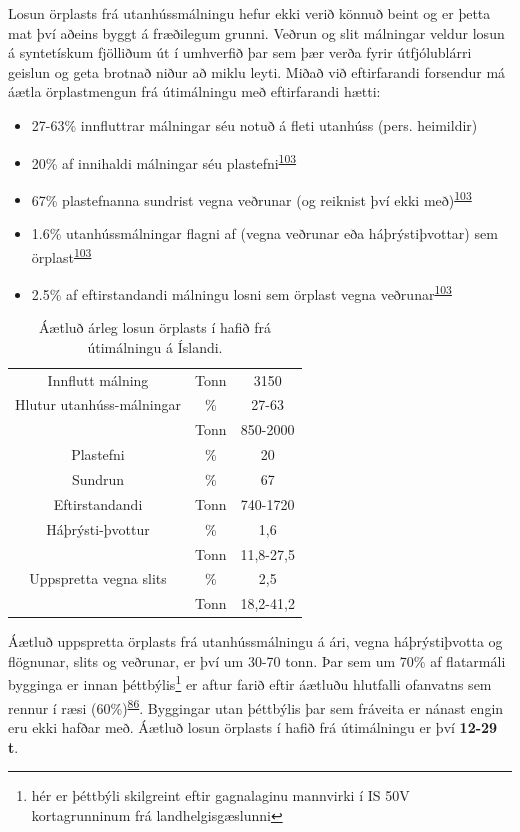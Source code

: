 \documentclass[icelandic,]{book}
\providecommand{\tightlist}{%
  \setlength{\itemsep}{0pt}\setlength{\parskip}{0pt}}
\let\rmarkdownfootnote\footnote%
\def\footnote{\protect\rmarkdownfootnote}
\begin{document}
Losun örplasts frá utanhússmálningu hefur ekki verið könnuð beint og er þetta mat því aðeins byggt á fræðilegum grunni. Veðrun og slit málningar veldur losun á syntetískum fjölliðum út í umhverfið þar sem þær verða fyrir útfjólublárri geislun og geta brotnað niður að miklu leyti. Miðað við eftirfarandi forsendur má áætla örplastmengun frá útimálningu með eftirfarandi hætti:

\begin{itemize}
\tightlist
\item
  27-63\% innfluttrar málningar séu notuð á fleti utanhúss (pers. heimildir)
\item
  20\% af innihaldi málningar séu plastefni\textsuperscript{\protect\hyperlink{ref-Hann2018}{103}}
\item
  67\% plastefnanna sundrist vegna veðrunar (og reiknist því ekki með)\textsuperscript{\protect\hyperlink{ref-Hann2018}{103}}
\item
  1.6\% utanhússmálningar flagni af (vegna veðrunar eða háþrýstiþvottar) sem örplast\textsuperscript{\protect\hyperlink{ref-Hann2018}{103}}
\item
  2.5\% af eftirstandandi málningu losni sem örplast vegna veðrunar\textsuperscript{\protect\hyperlink{ref-Hann2018}{103}}
\end{itemize}

\begin{table}[t]

\caption{\label{tab:malningartafla}Áætluð árleg losun örplasts í hafið frá útimálningu á Íslandi.}
\centering
\begin{tabular}{ccc}
\toprule
Innflutt málning & Tonn & 3150\\
Hlutur utanhúss-málningar & \% & 27-63\\
 & Tonn & 850-2000\\
Plastefni & \% & 20\\
Sundrun & \% & 67\\
\addlinespace
Eftirstandandi & Tonn & 740-1720\\
Háþrýsti-þvottur & \% & 1,6\\
 & Tonn & 11,8-27,5\\
Uppspretta vegna slits & \% & 2,5\\
 & Tonn & 18,2-41,2\\
\bottomrule
\end{tabular}
\end{table}

Áætluð uppspretta örplasts frá utanhússmálningu á ári, vegna háþrýstiþvotta og flögnunar, slits og veðrunar, er því um 30-70 tonn. Þar sem um 70\% af flatarmáli bygginga er innan þéttbýlis\footnote{hér er þéttbýli skilgreint eftir gagnalaginu mannvirki í IS 50V kortagrunninum frá landhelgisgæslunni} er aftur farið eftir áætluðu hlutfalli ofanvatns sem rennur í ræsi (60\%)\textsuperscript{\protect\hyperlink{ref-Verschoor2016}{86}}. Byggingar utan þéttbýlis þar sem fráveita er nánast engin eru ekki hafðar með. Áætluð losun örplasts í hafið frá útimálningu er því \textbf{12-29 t}.
\end{document}
